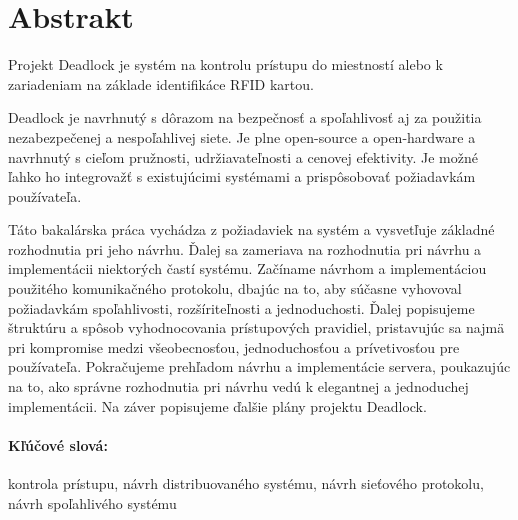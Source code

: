 
\newpage
\section*{Abstrakt}

Projekt Deadlock je systém na kontrolu prístupu do miestností alebo k zariadeniam na základe identifikáce RFID kartou.

Deadlock je navrhnutý s dôrazom na bezpečnosť a spoľahlivosť aj za použitia nezabezpečenej
a nespoľahlivej siete. Je plne open-source a open-hardware a navrhnutý s cieľom pružnosti,
udržiavateľnosti a cenovej efektivity. Je možné ľahko ho integrovažť s existujúcimi systémami
a prispôsobovať požiadavkám používateľa.

Táto bakalárska práca vychádza z požiadaviek na systém a vysvetľuje základné
rozhodnutia pri jeho návrhu. Ďalej sa zameriava na rozhodnutia pri návrhu a implementácii
niektorých častí systému. Začíname návrhom a implementáciou použitého komunikačného protokolu,
dbajúc na to, aby súčasne vyhovoval
požiadavkám spoľahlivosti, rozšíriteľnosti a jednoduchosti. Ďalej popisujeme štruktúru
a spôsob vyhodnocovania prístupových pravidiel, pristavujúc sa najmä pri kompromise medzi všeobecnosťou,
jednoduchosťou a prívetivosťou pre používateľa. Pokračujeme prehľadom návrhu a implementácie servera,
poukazujúc na to, ako správne rozhodnutia pri návrhu vedú k elegantnej a jednoduchej
implementácii.  Na záver popisujeme ďalšie plány projektu Deadlock.

\paragraph*{Kľúčové slová:} kontrola prístupu, návrh distribuovaného systému, návrh sieťového protokolu, návrh spoľahlivého systému


%
%



\newpage

\tableofcontents






\mainmatter
